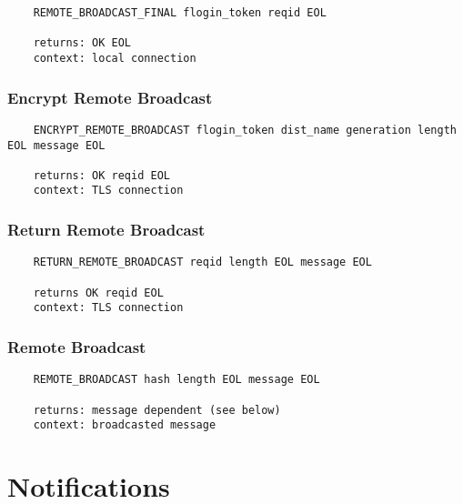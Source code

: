 \documentclass[letterpaper,11pt,oneside]{article}
\begin{document}
\vspace{10pt}
\begin{verbatim}
    REMOTE_BROADCAST_FINAL flogin_token reqid EOL 

    returns: OK EOL
    context: local connection
\end{verbatim}
\vspace{10pt}

\subsubsection{Encrypt Remote Broadcast}

\vspace{10pt}
\begin{verbatim}
    ENCRYPT_REMOTE_BROADCAST flogin_token dist_name generation length EOL message EOL

    returns: OK reqid EOL
    context: TLS connection
\end{verbatim}
\vspace{10pt}

\subsubsection{Return Remote Broadcast}

\vspace{10pt}
\begin{verbatim}
    RETURN_REMOTE_BROADCAST reqid length EOL message EOL

    returns OK reqid EOL
    context: TLS connection
\end{verbatim}
\vspace{10pt}

\subsubsection{Remote Broadcast}

\vspace{10pt}
\begin{verbatim}
    REMOTE_BROADCAST hash length EOL message EOL

    returns: message dependent (see below)
    context: broadcasted message
\end{verbatim}
\vspace{10pt}

\section{Notifications}
\end{document}
